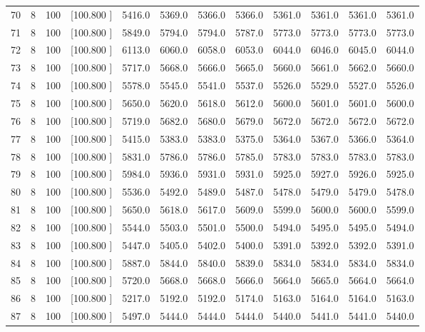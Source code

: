 \documentclass[12pt,a4paper]{article}
\begin{document}
\begin{center}
{\begin{tabular}{r r r r r r r r r r r r}
  70&  8&100&[100.800   ]&  5416.0&  5369.0&  5366.0&  5366.0&  5361.0&  5361.0&  5361.0&  5361.0\\[-0.02in]
  71&  8&100&[100.800   ]&  5849.0&  5794.0&  5794.0&  5787.0&  5773.0&  5773.0&  5773.0&  5773.0\\[-0.02in]
  72&  8&100&[100.800   ]&  6113.0&  6060.0&  6058.0&  6053.0&  6044.0&  6046.0&  6045.0&  6044.0\\[-0.02in]
  73&  8&100&[100.800   ]&  5717.0&  5668.0&  5666.0&  5665.0&  5660.0&  5661.0&  5662.0&  5660.0\\[-0.02in]
  74&  8&100&[100.800   ]&  5578.0&  5545.0&  5541.0&  5537.0&  5526.0&  5529.0&  5527.0&  5526.0\\[-0.02in]
  75&  8&100&[100.800   ]&  5650.0&  5620.0&  5618.0&  5612.0&  5600.0&  5601.0&  5601.0&  5600.0\\[-0.02in]
  76&  8&100&[100.800   ]&  5719.0&  5682.0&  5680.0&  5679.0&  5672.0&  5672.0&  5672.0&  5672.0\\[-0.02in]
  77&  8&100&[100.800   ]&  5415.0&  5383.0&  5383.0&  5375.0&  5364.0&  5367.0&  5366.0&  5364.0\\[-0.02in]
  78&  8&100&[100.800   ]&  5831.0&  5786.0&  5786.0&  5785.0&  5783.0&  5783.0&  5783.0&  5783.0\\[-0.02in]
  79&  8&100&[100.800   ]&  5984.0&  5936.0&  5931.0&  5931.0&  5925.0&  5927.0&  5926.0&  5925.0\\[-0.02in]
  80&  8&100&[100.800   ]&  5536.0&  5492.0&  5489.0&  5487.0&  5478.0&  5479.0&  5479.0&  5478.0\\[-0.02in]
  81&  8&100&[100.800   ]&  5650.0&  5618.0&  5617.0&  5609.0&  5599.0&  5600.0&  5600.0&  5599.0\\[-0.02in]
  82&  8&100&[100.800   ]&  5544.0&  5503.0&  5501.0&  5500.0&  5494.0&  5495.0&  5495.0&  5494.0\\[-0.02in]
  83&  8&100&[100.800   ]&  5447.0&  5405.0&  5402.0&  5400.0&  5391.0&  5392.0&  5392.0&  5391.0\\[-0.02in]
  84&  8&100&[100.800   ]&  5887.0&  5844.0&  5840.0&  5839.0&  5834.0&  5834.0&  5834.0&  5834.0\\[-0.02in]
  85&  8&100&[100.800   ]&  5720.0&  5668.0&  5668.0&  5666.0&  5664.0&  5665.0&  5664.0&  5664.0\\[-0.02in]
  86&  8&100&[100.800   ]&  5217.0&  5192.0&  5192.0&  5174.0&  5163.0&  5164.0&  5164.0&  5163.0\\[-0.02in]
  87&  8&100&[100.800   ]&  5497.0&  5444.0&  5444.0&  5444.0&  5440.0&  5441.0&  5441.0&  5440.0\\[-0.02in]

\end{tabular}}
\end{center}
\end{document}
